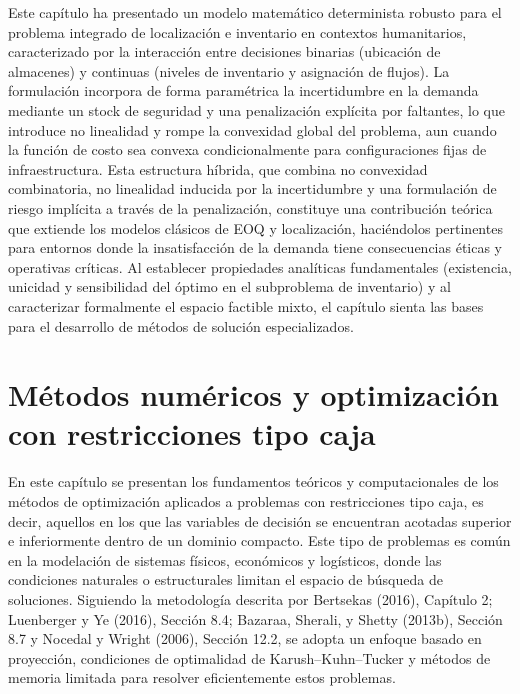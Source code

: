 \documentclass[
  spanish,
  us-letterpaper,
]{scrreprt}
\numberwithin{equation}{section}
\begin{document}
Este capítulo ha presentado un modelo matemático determinista robusto
para el problema integrado de localización e inventario en contextos
humanitarios, caracterizado por la interacción entre decisiones binarias
(ubicación de almacenes) y continuas (niveles de inventario y asignación
de flujos). La formulación incorpora de forma paramétrica la
incertidumbre en la demanda mediante un stock de seguridad y una
penalización explícita por faltantes, lo que introduce no linealidad y
rompe la convexidad global del problema, aun cuando la función de costo
sea convexa condicionalmente para configuraciones fijas de
infraestructura. Esta estructura híbrida, que combina no convexidad
combinatoria, no linealidad inducida por la incertidumbre y una
formulación de riesgo implícita a través de la penalización, constituye
una contribución teórica que extiende los modelos clásicos de EOQ y
localización, haciéndolos pertinentes para entornos donde la
insatisfacción de la demanda tiene consecuencias éticas y operativas
críticas. Al establecer propiedades analíticas fundamentales
(existencia, unicidad y sensibilidad del óptimo en el subproblema de
inventario) y al caracterizar formalmente el espacio factible mixto, el
capítulo sienta las bases para el desarrollo de métodos de solución
especializados.


\chapter{Métodos numéricos y optimización con restricciones tipo
caja}\label{muxe9todos-numuxe9ricos-y-optimizaciuxf3n-con-restricciones-tipo-caja}

En este capítulo se presentan los fundamentos teóricos y computacionales
de los métodos de optimización aplicados a problemas con restricciones
tipo caja, es decir, aquellos en los que las variables de decisión se
encuentran acotadas superior e inferiormente dentro de un dominio
compacto. Este tipo de problemas es común en la modelación de sistemas
físicos, económicos y logísticos, donde las condiciones naturales o
estructurales limitan el espacio de búsqueda de soluciones. Siguiendo la
metodología descrita por Bertsekas (2016), Capítulo 2; Luenberger y Ye
(2016), Sección 8.4; Bazaraa, Sherali, y Shetty (2013b), Sección 8.7 y
Nocedal y Wright (2006), Sección 12.2, se adopta un enfoque basado en
proyección, condiciones de optimalidad de Karush--Kuhn--Tucker y métodos
de memoria limitada para resolver eficientemente estos problemas.
\end{document}
